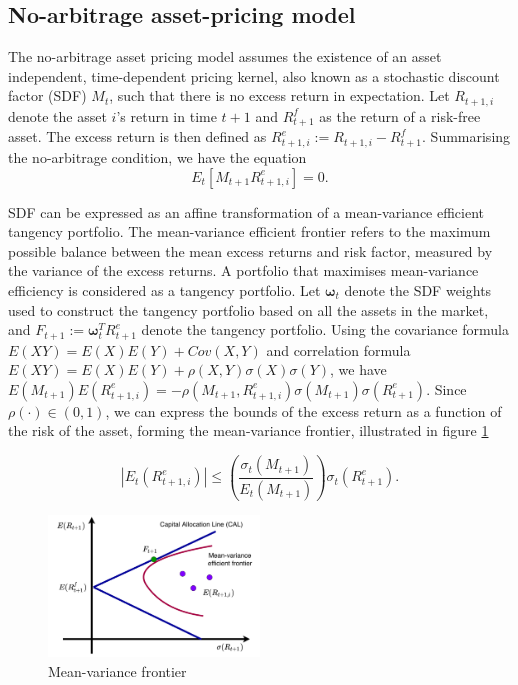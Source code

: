 \documentclass[12pt]{article}
\begin{document}
\hypertarget{no_arbitrage}{%
\subsection{No-arbitrage asset-pricing model}\label{no_arbitrage}}

The no-arbitrage asset pricing model assumes the existence
of an asset independent, time-dependent pricing kernel, also known as a stochastic
discount factor (SDF) \(M_t\), such that there is no excess
return in expectation.
Let \(R_{t+1, i}\) denote the asset \(i\)'s return in
time \(t+1\) and \(R^f_{t+1}\) as the return of a risk-free asset.
The excess return is then defined as \(R^e_{t+1, i} := R_{t+1, i} - R^f_{t+1}\). Summarising the no-arbitrage
condition, we have the equation
\[
E_t[M_{t+1} R^e_{t+1, i}] = 0.
\]

SDF can be expressed as an affine transformation of a
mean-variance efficient tangency portfolio.
The mean-variance efficient frontier refers to the maximum
possible balance between the mean excess returns and risk
factor, measured by the variance of the
excess returns. A portfolio that maximises mean-variance
efficiency is considered as a tangency portfolio.
Let \(\mathbf{\omega}_t\) denote the SDF weights used to
construct the tangency portfolio based on all the assets in
the market, and
\(F_{t+1} := \mathbf{\omega}_t^T R^e_{t+1}\) denote the tangency
portfolio.
Using the covariance formula
\(E(XY)=E(X)E(Y) + Cov(X, Y)\) and correlation formula
\(E(XY) = E(X)E(Y)+\rho(X, Y)\sigma(X)\sigma(Y)\),
we have \(E(M_{t+1})E(R^e_{t+1, i}) = -\rho(M_{t+1}, R^e_{t+1, i})\sigma(M_{t+1})\sigma(R^e_{t+1})\). Since
\(\rho(\cdot)\in(0, 1)\), we can express the bounds of the
excess return as a function of the risk of the asset,
forming the mean-variance frontier, illustrated in
figure \ref{fig:mvf}

\[
|E_t(R^e_{t+1, i})| \leq \left(\frac{\sigma_t(M_{t+1})}
{E_t(M_{t+1})}\right)\sigma_t(R^e_{t+1}).
\]

\begin{figure}
\centering
\includegraphics[width=0.5\textwidth,height=\textheight]{./src/mvf}
\caption{\label{fig:mvf} Mean-variance frontier}
\end{figure}
\end{document}
